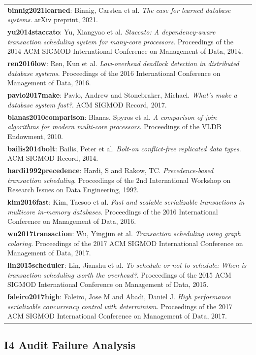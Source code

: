 \begin{longtable}{@{}p{15cm}@{}}
\textbf{binnig2021learned}: Binnig, Carsten et al. \textit{The case for learned database systems}. arXiv preprint, 2021. \\
\textbf{yu2014staccato}: Yu, Xiangyao et al. \textit{Staccato: A dependency-aware transaction scheduling system for many-core processors}. Proceedings of the 2014 ACM SIGMOD International Conference on Management of Data, 2014. \\
\textbf{ren2016low}: Ren, Kun et al. \textit{Low-overhead deadlock detection in distributed database systems}. Proceedings of the 2016 International Conference on Management of Data, 2016. \\
\textbf{pavlo2017make}: Pavlo, Andrew and Stonebraker, Michael. \textit{What's make a database system fast?}. ACM SIGMOD Record, 2017. \\
\textbf{blanas2010comparison}: Blanas, Spyros et al. \textit{A comparison of join algorithms for modern multi-core processors}. Proceedings of the VLDB Endowment, 2010. \\
\textbf{bailis2014bolt}: Bailis, Peter et al. \textit{Bolt-on conflict-free replicated data types}. ACM SIGMOD Record, 2014. \\
\textbf{hardi1992precedence}: Hardi, S and Rakow, TC. \textit{Precedence-based transaction scheduling}. Proceedings of the 2nd International Workshop on Research Issues on Data Engineering, 1992. \\
\textbf{kim2016fast}: Kim, Taesoo et al. \textit{Fast and scalable serializable transactions in multicore in-memory databases}. Proceedings of the 2016 International Conference on Management of Data, 2016. \\
\textbf{wu2017transaction}: Wu, Yingjun et al. \textit{Transaction scheduling using graph coloring}. Proceedings of the 2017 ACM SIGMOD International Conference on Management of Data, 2017. \\
\textbf{lin2015scheduler}: Lin, Jianshu et al. \textit{To schedule or not to schedule: When is transaction scheduling worth the overhead?}. Proceedings of the 2015 ACM SIGMOD International Conference on Management of Data, 2015. \\
\textbf{faleiro2017high}: Faleiro, Jose M and Abadi, Daniel J. \textit{High performance serializable concurrency control with determinism}. Proceedings of the 2017 ACM SIGMOD International Conference on Management of Data, 2017. \\
\end{longtable}


\subsection{I4 Audit Failure Analysis}
\label{app:i4_audit_analysis}

